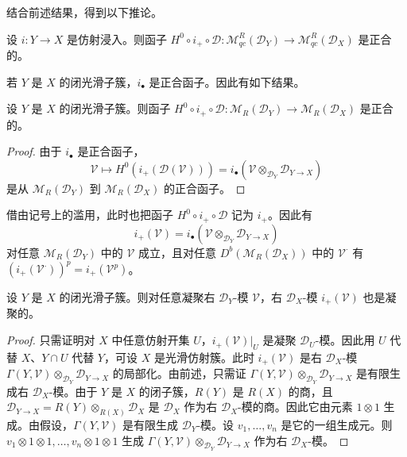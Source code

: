 结合前述结果，得到以下推论。

\begin{corollary}\label{cor:4.6.5}
设 $i:Y\to X$ 是仿射浸入。则函子
$H^0\circ i_+\circ\mathcal{D}:\mathcal{M}^R_{qc}(\mathcal{D}_Y)\to\mathcal{M}^R_{qc}(\mathcal{D}_X)$ 是正合的。
\end{corollary}

若 $Y$ 是 $X$ 的闭光滑子簇，$i_\bullet$ 是正合函子。因此有如下结果。

\begin{corollary}\label{cor:4.6.6}
设 $Y$ 是 $X$ 的闭光滑子簇。则函子
$H^0\circ i_+\circ\mathcal{D}:\mathcal{M}_R(\mathcal{D}_Y)\to\mathcal{M}_R(\mathcal{D}_X)$ 是正合的。
\end{corollary}

\begin{proof}
由于 $i_\bullet$ 是正合函子，
$$\mathcal{V}\longmapsto H^0(i_+(\mathcal{D}(\mathcal{V})))=i_\bullet(\mathcal{V}\otimes_{\mathcal{D}_Y}\mathcal{D}_{Y\to X})$$
是从 $\mathcal{M}_R(\mathcal{D}_Y)$ 到 $\mathcal{M}_R(\mathcal{D}_X)$ 的正合函子。
\end{proof}

借由记号上的滥用，此时也把函子 $H^0\circ i_+\circ\mathcal{D}$ 记为 $i_+$。因此有
$$i_+(\mathcal{V})=i_\bullet(\mathcal{V}\otimes_{\mathcal{D}_Y}\mathcal{D}_{Y\to X})$$
对任意 $\mathcal{M}_R(\mathcal{D}_Y)$ 中的 $\mathcal{V}$ 成立，且对任意 $D^b(\mathcal{M}_R(\mathcal{D}_X))$ 中的 $\mathcal{V}^\cdot$ 有
$(i_+(\mathcal{V}^\cdot))^p=i_+(\mathcal{V}^p)$。

\begin{proposition}\label{prop:4.6.7}
设 $Y$ 是 $X$ 的闭光滑子簇。则对任意凝聚右 $\mathcal{D}_Y$-模 $\mathcal{V}$，右 $\mathcal{D}_X$-模 $i_+(\mathcal{V})$ 也是凝聚的。
\end{proposition}

\begin{proof}
只需证明对 $X$ 中任意仿射开集 $U$，$i_+(\mathcal{V})|_U$ 是凝聚 $\mathcal{D}_U$-模。因此用 $U$ 代替 $X$、$Y\cap U$ 代替 $Y$，可设 $X$ 是光滑仿射簇。此时 $i_+(\mathcal{V})$ 是右 $\mathcal{D}_X$-模 $\Gamma(Y,\mathcal{V})\otimes_{\mathcal{D}_Y}\mathcal{D}_{Y\to X}$ 的局部化。由前述，只需证 $\Gamma(Y,\mathcal{V})\otimes_{\mathcal{D}_Y}\mathcal{D}_{Y\to X}$ 是有限生成右 $\mathcal{D}_X$-模。由于 $Y$ 是 $X$ 的闭子簇，$R(Y)$ 是 $R(X)$ 的商，且 $\mathcal{D}_{Y\to X}=R(Y)\otimes_{R(X)}\mathcal{D}_X$ 是 $\mathcal{D}_X$ 作为右 $\mathcal{D}_X$-模的商。因此它由元素 $1\otimes1$ 生成。由假设，$\Gamma(Y,\mathcal{V})$ 是有限生成 $\mathcal{D}_Y$-模。设 $v_1,\dots,v_n$ 是它的一组生成元。则 $v_1\otimes1\otimes1,\dots,v_n\otimes1\otimes1$ 生成
$\Gamma(Y,\mathcal{V})\otimes_{\mathcal{D}_Y}\mathcal{D}_{Y\to X}$ 作为右 $\mathcal{D}_X$-模。
\end{proof}

